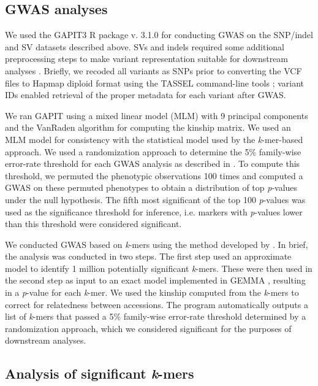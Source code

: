\subsection*{GWAS analyses}
\label{sv-gwas-gwas-methods}

We used the GAPIT3 R package v. 3.1.0 \citep{wang2021} for conducting GWAS on
the SNP/indel and SV datasets described above. SVs and indels required some additional
preprocessing steps to make variant
representation suitable for downstream analyses \citep{lemay2022gwas}. Briefly, we recoded all
variants as SNPs prior to converting the VCF files to Hapmap diploid format
using the TASSEL command-line tools \citep{bradbury2007}; variant IDs enabled
retrieval of the proper metadata for each variant after GWAS.

We ran GAPIT using a mixed linear model (MLM) with 9 principal components and the VanRaden
algorithm for computing the kinship matrix. We used an MLM model for
consistency with the statistical model used by the \textit{k}-mer-based
approach.  We used a randomization approach to determine the 5\% family-wise
error-rate threshold for each GWAS analysis as described in \cite{voichek2020}.
To compute this threshold, we permuted the phenotypic observations 100 times
and computed a GWAS on these permuted phenotypes to obtain a distribution of
top \emph{p}-values under the null hypothesis. The fifth most significant of
the top 100 \emph{p}-values was used as the significance threshold for
inference, i.e. markers with \emph{p}-values lower than this threshold were
considered significant.

We conducted GWAS based on \emph{k}-mers using the method developed by
\cite{voichek2020}. In brief, the
analysis was conducted in two steps. The first step used an approximate model
to identify 1 million potentially significant \emph{k}-mers. These were then used in
the second step as input to an exact model implemented in GEMMA \citep{zhou2012}, resulting
in a \emph{p}-value for each \emph{k}-mer. We
used the kinship computed from the \emph{k}-mers to correct for relatedness
between accessions. The program automatically outputs a list of \emph{k}-mers
that passed a 5\% family-wise error-rate threshold determined by a
randomization approach, which we considered significant for the purposes of
downstream analyses.

\subsection*{Analysis of significant \emph{k}-mers}
\label{sv-gwas-kmers-analysis-methods}

